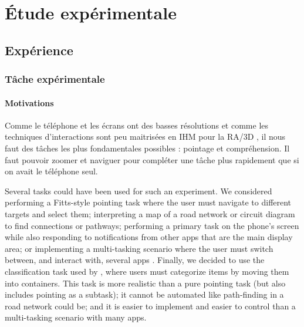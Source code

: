 \chapter{Étude expérimentale}
\label{ch:experiment}

\section{Expérience}
\label{sec:experiment}

\subsection{Tâche expérimentale}
\label{subs:experiment_task}

\subsubsection{Motivations}
Comme le téléphone et les écrans ont des basses résolutions et comme les techniques d'interactions sont peu maitrisées en IHM pour la RA/3D \citep{Piumsomboon2013}, il nous faut des tâches les plus fondamentales possibles : pointage et compréhension. Il faut pouvoir zoomer et naviguer pour compléter une tâche plus rapidement que si on avait le téléphone seul.

Several tasks could have been used for such an experiment. We considered performing a Fitts-style pointing task \citep{Soukoreff2004} where the user must navigate to different targets and select them; interpreting a map of a road network \citep{Baudisch2002} or circuit diagram to find connections or pathways; performing a primary task on the phone's screen while also responding to notifications from other apps that are  the main display area; or implementing a multi-tasking scenario where the user must switch between, and interact with, several apps \citep{Ens2014}. Finally, we decided to use the classification task used by \cite{Liu2014}, where users must categorize items by moving them into containers. This task is more realistic than a pure pointing task (but also includes pointing as a subtask); it cannot be automated like path-finding in a road network could be; and it is easier to implement and easier to control than a multi-tasking scenario with many apps.


